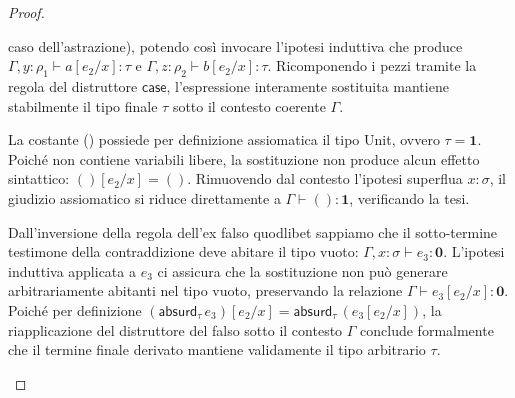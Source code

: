 \begin{proof}
\begin{description}[leftmargin=1.5em, style=nextline]
            caso dell'astrazione), potendo così invocare l'ipotesi induttiva che produce $\Gamma, y:\rho_1 \vdash a[e_2/x] : \tau$ e $\Gamma, z:\rho_2 \vdash b[e_2/x] : \tau$. Ricomponendo i pezzi tramite la 
            regola del distruttore $\mathsf{case}$, l'espressione interamente sostituita mantiene stabilmente il tipo finale $\tau$ sotto il contesto coerente $\Gamma$.
        \item [Caso Costante Unit ($e_1 = ()$)] 
            La costante () possiede per definizione assiomatica il tipo Unit, ovvero $\tau = \mathbf{1}$. Poiché non contiene variabili libere, la sostituzione non produce alcun effetto sintattico: $()[e_2/x] = ()$. 
            Rimuovendo dal contesto l'ipotesi superflua $x:\sigma$, il giudizio assiomatico si riduce direttamente a $\Gamma \vdash () : \mathbf{1}$, verificando la tesi.
        \item [Caso Eliminazione del Falso ($e_1 = \mathsf{absurd}_{\tau} \, e_3$)] 
            Dall'inversione della regola dell'ex falso quodlibet sappiamo che il sotto-termine testimone della contraddizione deve abitare il tipo vuoto: $\Gamma, x:\sigma \vdash e_3 : \mathbf{0}$. L'ipotesi induttiva applicata a $e_3$ ci assicura che la sostituzione non può generare arbitrariamente abitanti nel tipo vuoto, preservando la relazione $\Gamma \vdash e_3[e_2/x] : \mathbf{0}$. Poiché per definizione $\left(\mathsf{absurd}_{\tau} \, e_3\right)[e_2/x] = \mathsf{absurd}_{\tau} \, (e_3[e_2/x])$, la riapplicazione del distruttore del falso sotto il contesto $\Gamma$ conclude formalmente che il termine finale derivato mantiene validamente il tipo arbitrario $\tau$.
    \end{description}
\end{proof}

